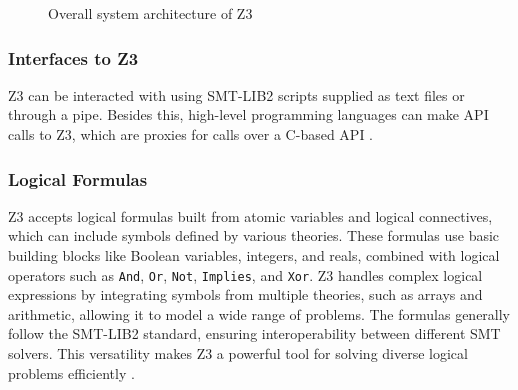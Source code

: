 \documentclass[]{rptuseminar}
\begin{document}
 \begin{figure}[ht]
  \begin{center}
  \end{center}
  \caption{%
     Overall system architecture of Z3
    \cite{nikolaj_bjorner_programming_nodate}
  }
  \label{fig:scholar} %
\end{figure}

\subsubsection{Interfaces to Z3}
Z3 can be interacted with using SMT-LIB2 scripts supplied as text ﬁles or through a pipe.
Besides this, high-level programming languages can make API calls to Z3, which are proxies
for calls over a C-based API \cite{nikolaj_bjorner_programming_nodate}.

\subsubsection{Logical Formulas}
Z3 accepts logical formulas built from atomic variables and logical connectives, which can include symbols defined by various theories.
These formulas use basic building blocks like Boolean variables, integers, and reals, combined with logical operators such as
\texttt{And}, \texttt{Or}, \texttt{Not}, \texttt{Implies}, and \texttt{Xor}. Z3 handles complex logical expressions by
integrating symbols from multiple theories, such as arrays and arithmetic, allowing it to model a wide range of problems.
The formulas generally follow the SMT-LIB2 standard, ensuring interoperability between different SMT solvers. 
This versatility makes Z3 a powerful tool for solving diverse logical problems efficiently \cite{nikolaj_bjorner_programming_nodate}.
\end{document}
